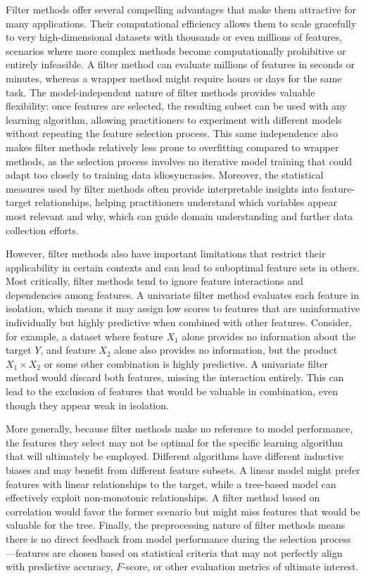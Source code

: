 Filter methods offer several compelling advantages that make them attractive for many applications. Their computational efficiency allows them to scale gracefully to very high-dimensional datasets with thousands or even millions of features, scenarios where more complex methods become computationally prohibitive or entirely infeasible. A filter method can evaluate millions of features in seconds or minutes, whereas a wrapper method might require hours or days for the same task. The model-independent nature of filter methods provides valuable flexibility: once features are selected, the resulting subset can be used with any learning algorithm, allowing practitioners to experiment with different models without repeating the feature selection process. This same independence also makes filter methods relatively less prone to overfitting compared to wrapper methods, as the selection process involves no iterative model training that could adapt too closely to training data idiosyncrasies. Moreover, the statistical measures used by filter methods often provide interpretable insights into feature-target relationships, helping practitioners understand which variables appear most relevant and why, which can guide domain understanding and further data collection efforts.

However, filter methods also have important limitations that restrict their applicability in certain contexts and can lead to suboptimal feature sets in others. Most critically, filter methods tend to ignore feature interactions and dependencies among features. A univariate filter method evaluates each feature in isolation, which means it may assign low scores to features that are uninformative individually but highly predictive when combined with other features. Consider, for example, a dataset where feature $X_1$ alone provides no information about the target $Y$, and feature $X_2$ alone also provides no information, but the product $X_1 \times X_2$ or some other combination is highly predictive. A univariate filter method would discard both features, missing the interaction entirely. This can lead to the exclusion of features that would be valuable in combination, even though they appear weak in isolation.

More generally, because filter methods make no reference to model performance, the features they select may not be optimal for the specific learning algorithm that will ultimately be employed. Different algorithms have different inductive biases and may benefit from different feature subsets. A linear model might prefer features with linear relationships to the target, while a tree-based model can effectively exploit non-monotonic relationships. A filter method based on correlation would favor the former scenario but might miss features that would be valuable for the tree. Finally, the preprocessing nature of filter methods means there is no direct feedback from model performance during the selection process—features are chosen based on statistical criteria that may not perfectly align with predictive accuracy, $F$-score, or other evaluation metrics of ultimate interest.

